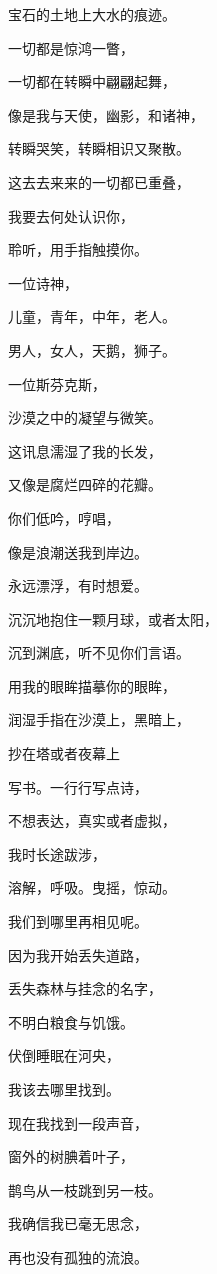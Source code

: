 \documentclass[UTF8]{article}
\begin{document}
\par 宝石的土地上大水的痕迹。
\par 一切都是惊鸿一瞥，
\par 一切都在转瞬中翩翩起舞，
\par 像是我与天使，幽影，和诸神，
\par 转瞬哭笑，转瞬相识又聚散。
\par 这去去来来的一切都已重叠，
\par 我要去何处认识你，
\par 聆听，用手指触摸你。
\par 一位诗神，
\par 儿童，青年，中年，老人。
\par 男人，女人，天鹅，狮子。
\par 一位斯芬克斯，
\par 沙漠之中的凝望与微笑。
\\[0.6cm]
\par 这讯息濡湿了我的长发，
\par 又像是腐烂四碎的花瓣。
\par 你们低吟，哼唱，
\par 像是浪潮送我到岸边。
\par 永远漂浮，有时想爱。
\par 沉沉地抱住一颗月球，或者太阳，
\par 沉到渊底，听不见你们言语。
\par 用我的眼眸描摹你的眼眸，
\par 润湿手指在沙漠上，黑暗上，
\par 抄在塔或者夜幕上
\par 写书。一行行写点诗，
\par 不想表达，真实或者虚拟，
\par 我时长途跋涉，
\par 溶解，呼吸。曳摇，惊动。
\par 我们到哪里再相见呢。
\par 因为我开始丢失道路，
\par 丢失森林与挂念的名字，
\par 不明白粮食与饥饿。
\par 伏倒睡眠在河央，
\par 我该去哪里找到。
\\[0.6cm]
\par 现在我找到一段声音，
\par 窗外的树腆着叶子，
\par 鹊鸟从一枝跳到另一枝。
\par 我确信我已毫无思念，
\par 再也没有孤独的流浪。
\end{document}
